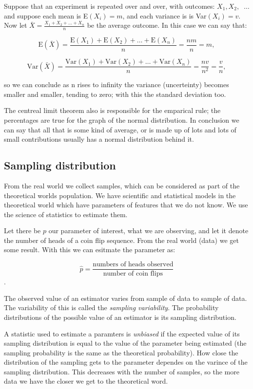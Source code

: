 Suppose that an experiment is repeated over and over, with outcomes: $X_1, X_2,
$ $~\ldots$ and suppose each mean is E$(X_i) = m$, and each variance is is
Var$(X_i)=v$. Now let $\bar{X} = \frac{X_1 + X_2 +\ldots + X_n}{n}$ be the
average outcome. In this case we can say that:

\[ \mbox{E}(\bar{X}) = \frac{\mbox{E}(X_1) + \mbox{E}(X_2) + \ldots +
\mbox{E}(X_n)}{n} = \frac{nm}{n} = m,\]

\[ \mbox{Var}(\bar{X}) = \frac{\mbox{Var}(X_1) + \mbox{Var}(X_2) + \ldots +
\mbox{Var}(X_n)}{n} = \frac{nv}{n^2} = \frac{v}{n},\]

so we can conclude as n rises to infinity the variance (uncerteinty) becomes
smaller and smaller, tending to zero; with this the standard deviation too.

The centreal limit theorem also is responsible for the emparical rule; the
percentages are true for the graph of the normal distribution. In conclusion we
can say that all that is some kind of average, or is made up of lots and lots of
small contributions usually has a normal distribution behind it.

\subsection{Sampling distribution}

From the real world we collect samples, which can be considered as part of the
theoretical worlds population. We have scientific and statistical models in the
theoretical world which have parameters of features that we do not know. We use
the science of statistics to estimate them.

Let there be $p$ our parameter of interest, what we are observing, and let it
denote the number of heads of a coin flip sequence. From the real world (data)
we get some result. With this we can esitmate the parameter as:

 \[ \hat{p} = \frac{\mbox{numbers of heads observed}}{\mbox{number of coin
 flips}}\].
 
 The observed value of an estimator varies from sample of data to sample of
 data. The variability of this is called the \emph{sampling variability}. The
 probability distributions of the possible value of an estimator is its sampling
 distribution.
 
 A statistic used to estimate a paramters is \emph{unbiased} if the expected
 value of its sampling distribution is equal to the value of the parameter being
 estimated (the sampling probability is the same as the theoretical
 probability). How close the distribution of the sampling gets to the parameter
 dependes on the varince of the sampling distribution. This decreases with the
 number of samples, so the more data we have the closer we get to the
 theoretical word.
 
